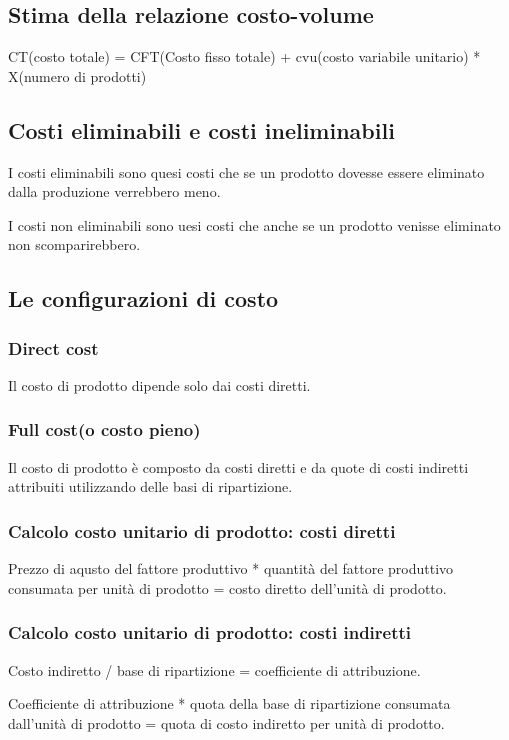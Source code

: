\subsection{Stima della relazione costo-volume}
CT(costo totale) = CFT(Costo fisso totale) + cvu(costo variabile unitario) * X(numero di prodotti)

\subsection{Costi eliminabili e costi ineliminabili}
I costi eliminabili sono quesi costi che se un prodotto dovesse essere eliminato dalla produzione verrebbero meno.

I costi non eliminabili sono uesi costi che anche se un prodotto venisse eliminato non scomparirebbero.

\subsection{Le configurazioni di costo}
\subsubsection{Direct cost}
Il costo di prodotto dipende solo dai costi diretti.

\subsubsection{Full cost(o costo pieno)}
Il costo di prodotto è composto da costi diretti e da quote di costi indiretti attribuiti utilizzando 
delle basi di ripartizione.

\subsubsection{Calcolo costo unitario di prodotto: costi diretti}
Prezzo di aqusto del fattore produttivo * quantità del fattore produttivo consumata per unità di prodotto = costo diretto dell'unità di prodotto.

\subsubsection{Calcolo costo unitario di prodotto: costi indiretti}

Costo indiretto / base di ripartizione = coefficiente di attribuzione.


Coefficiente di attribuzione * quota della base di ripartizione consumata dall'unità di prodotto = quota di costo indiretto per unità di prodotto.

